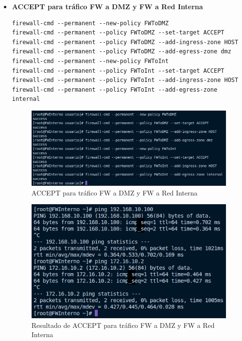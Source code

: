 \documentclass[11pt]{report}
\begin{document}
\cleardoublepage

\begin{itemize}
  \item \textbf{ACCEPT para tráfico FW a DMZ y FW a Red Interna}
  \begin{verbatim}
firewall-cmd --permanent --new-policy FWToDMZ
firewall-cmd --permanent --policy FWToDMZ --set-target ACCEPT
firewall-cmd --permanent --policy FWToDMZ --add-ingress-zone HOST
firewall-cmd --permanent --policy FWToDMZ --add-egress-zone dmz
firewall-cmd --permanent --new-policy FWToInt
firewall-cmd --permanent --policy FWToInt --set-target ACCEPT
firewall-cmd --permanent --policy FWToInt --add-ingress-zone HOST
firewall-cmd --permanent --policy FWToInt --add-egress-zone internal
  \end{verbatim}
  \begin{figure}[H]
    \centering
    \includegraphics[scale=0.55]{img/accept_fw_to_dmz_fw_Int.png}
    \caption{ACCEPT para tráfico FW a DMZ y FW a Red Interna}
    \label{fig:ACCEPT para tráfico FW a DMZ y FW a Red Interna}
  \end{figure}

  \begin{figure}[H]
    \centering
    \includegraphics[scale=0.75]{img/result_accept_fw_to_dmz_int.png}
    \caption{Resultado de ACCEPT para tráfico FW a DMZ y FW a Red Interna}
    \label{fig:Resultado de ACCEPT para tráfico FW a DMZ y FW a Red Interna}
  \end{figure}


\end{itemize}
\end{document}
